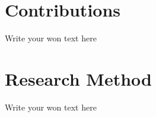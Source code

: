 \documentclass[11pt, a4paper]{article}
\begin{document}
\section*{Contributions}

Write your won text here

\section*{Research Method}

Write your won text here
\end{document}
